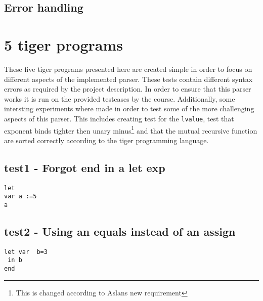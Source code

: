 \documentclass{article}
\begin{document}
\subsection{Error handling}

\section{5 tiger programs}


These five tiger programs presented here are created simple in order to focus on different aspects of the implemented parser. These tests contain different syntax errors as required by the project description. In order to ensure that this parser works it is run on the provided testcases by the course. Additionally, some intersting experiments where made in order to test some of the more challenging aspects of this parser. This includes creating test for the \texttt{lvalue}, test that exponent binds tighter then unary minus\footnote{This is changed according to Aslans new requirement} and that the mutual recursive function are sorted correctly according to the tiger programming language.

\subsection{test1 - Forgot end in a let exp}
\begin{lstlisting}[frame=single]
let
var a :=5
a
\end{lstlisting}


\subsection{test2 - Using an equals instead of an assign}
\begin{lstlisting}[frame=single]
let var  b=3
 in b
end
\end{lstlisting}

\end{document}
